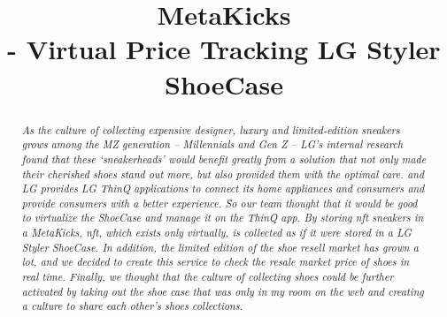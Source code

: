 \documentclass[conference]{IEEEtran}
\begin{document}
\title{MetaKicks\\
- Virtual Price Tracking LG Styler ShoeCase 
}

\author{
\and
{}
\and
{}
\and
{}
}

\maketitle

\begin{abstract}
\textit{As the culture of collecting expensive designer, luxury and limited-edition sneakers grows among the MZ generation – Millennials and Gen Z – LG’s internal research found that these ‘sneakerheads’ would benefit greatly from a solution that not only made their cherished shoes stand out more, but also provided them with the optimal care. and LG provides LG ThinQ applications to connect its home appliances and consumers and provide consumers with a better experience. So our team thought that it would be good to virtualize the ShoeCase and manage it on the ThinQ app. By storing nft sneakers in a MetaKicks, nft, which exists only virtually, is collected as if it were stored in a LG Styler ShoeCase. In addition, the limited edition of the shoe resell market has grown a lot, and we decided to create this service to check the resale market price of shoes in real time. Finally, we thought that the culture of collecting shoes could be further activated by taking out the shoe case that was only in my room on the web and creating a culture to share each other's shoes collections.}\end{abstract}
\end{document}
